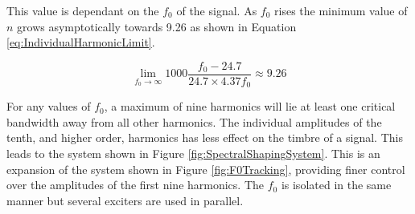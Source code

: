 		This value is dependant on the $f_{0}$ of the signal. As $f_{0}$ rises the minimum value of $n$ grows
		asymptotically towards 9.26 as shown in Equation \ref{eq:IndividualHarmonicLimit}.

		\begin{equation}
			\lim_{f_{0} \to \infty} 1000 \frac{f_{0} - 24.7}{24.7 \times 4.37f_{0}} \approx 9.26
			\label{eq:IndividualHarmonicLimit}
		\end{equation}

		For any values of $f_{0}$, a maximum of nine harmonics will lie at least one critical bandwidth away from
		all other harmonics. The individual amplitudes of the tenth, and higher order, harmonics has less effect on
		the timbre of a signal. This leads to the system shown in Figure \ref{fig:SpectralShapingSystem}. This is
		an expansion of the system shown in Figure \ref{fig:F0Tracking}, providing finer control over the
		amplitudes of the first nine harmonics. The $f_{0}$ is isolated in the same manner but several exciters are
		used in parallel.

